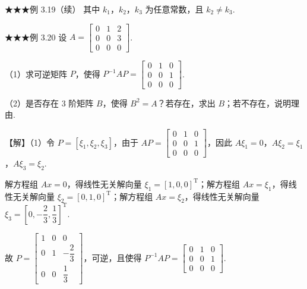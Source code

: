 \begin{fcard}{★★★例 3.19（续）}
其中 $k_1$，$k_2$，$k_3$ 为任意常数，且 $k_2\neq k_3$.
\end{fcard}

\begin{fcard}{★★★例 3.20}
设 $A=\begin{bmatrix}0 & 1 & 2\\ 0 & 0 & 3\\ 0 & 0 & 0\end{bmatrix}$.

（1）求可逆矩阵 $P$，使得 $P^{-1}AP=\begin{bmatrix}0 & 1 & 0\\ 0 & 0 & 1\\ 0 & 0 & 0\end{bmatrix}$.

（2）是否存在 3 阶矩阵 $B$，使得 $B^{2}=A$？若存在，求出 $B$；若不存在，说明理由.

【解】（1）令 $P=[\xi_1,\xi_2,\xi_3]$，由于 $AP=\begin{bmatrix}0 & 1 & 0\\ 0 & 0 & 1\\ 0 & 0 & 0\end{bmatrix}$，因此 $A\xi_1=0$，$A\xi_2=\xi_1$，$A\xi_3=\xi_2$.

解方程组 $Ax=0$，得线性无关解向量 $\xi_1=[1,0,0]^{\mathrm{T}}$；解方程组 $Ax=\xi_1$，得线性无关解向量 $\xi_2=[0,1,0]^{\mathrm{T}}$；解方程组 $Ax=\xi_2$，得线性无关解向量 $\xi_3=\left[0,-\dfrac{2}{3},\dfrac{1}{3}\right]^{\mathrm{T}}$.

故 $P=\begin{bmatrix}1 & 0 & 0\\ 0 & 1 & -\dfrac{2}{3}\\ 0 & 0 & \dfrac{1}{3}\end{bmatrix}$，可逆，且使得 $P^{-1}AP=\begin{bmatrix}0 & 1 & 0\\ 0 & 0 & 1\\ 0 & 0 & 0\end{bmatrix}$.


\end{fcard}
